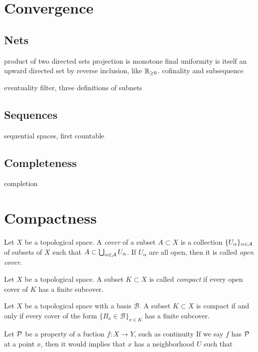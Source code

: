 \documentclass{../crs}
\begin{document}
\chapter{Convergence}

\section{Nets}

product of two directed sets
projection is monotone final
uniformity is itself an upward directed set by reverse inclusion, like $\mathbb{R}_{\ge0}$.
cofinality and subsequence

eventuality filter, three definitions of subnets

\section{Sequences}
sequential spaces, first countable

\section{Completeness}
completion















\chapter{Compactness}


\begin{defn}
Let $X$ be a topological space.
A \emph{cover} of a subset $A\subset X$ is a collection $\{U_\alpha\}_{\alpha\in\mathcal{A}}$ of subsets of $X$ such that $A\subset\bigcup_{\alpha\in\mathcal{A}}U_\alpha$.
If $U_\alpha$ are all open, then it is called \emph{open cover}.
\end{defn}
\begin{defn}
Let $X$ be a topological space.
A subset $K\subset X$ is called \emph{compact} if every open cover of $K$ has a finite subcover.
\end{defn}
\begin{prop}
Let $X$ be a topological space with a basis $\mathcal{B}$.
A subset $K\subset X$ is compact if and only if every cover of the form $\{B_x\in\mathcal{B}\}_{x\in K}$ has a finite subcover.
\end{prop}
\begin{rmk}
Let $\mathcal{P}$ be a property of a fuction $f\colon X\to Y$, such as continuity
If we say $f$ has $\mathcal{P}$ at a point $x$, then it would implies that $x$ has a neighborhood $U$ such that 
\end{rmk}
\end{document}
